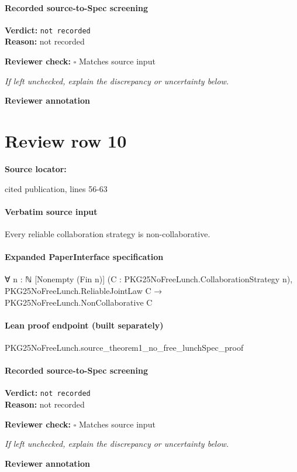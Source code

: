 \documentclass[10pt]{article}
\newcommand{\reviewerbox}{%
  \par\noindent\fbox{\parbox{0.96\linewidth}{\rule{0pt}{0.38in}}}\par
}
\newcommand{\reviewmatch}[1]{%
  \par\noindent\textbf{Reviewer check:} $\square$\; #1\par
  \noindent\emph{If left unchecked, explain the discrepancy or uncertainty below.}\par
}
\begin{document}
\paragraph{Recorded source-to-Spec screening}
\textbf{Verdict:} \texttt{not recorded}
\\
\textbf{Reason:} not recorded
\reviewmatch{Matches source input}
\noindent\textbf{Reviewer annotation}\par
\reviewerbox
\clearpage
\hypertarget{source-claim-bf0315dd1a18c70e}{}
\section*{Review row 10}
\textbf{Source locator:} {\footnotesize\raggedright cited publication, lines 56-\allowbreak{}63\par}
\paragraph{Verbatim source input}
\begin{ReviewVerbatim}
\setcounter{theorem}{0}
\begin{theorem}\label{thm:main}
    Every reliable collaboration strategy is non-collaborative.




\end{theorem}
\end{ReviewVerbatim}


\paragraph{Expanded PaperInterface specification}
\begin{ReviewVerbatim}
∀ {n : ℕ} [Nonempty (Fin n)] (C : PKG25NoFreeLunch.CollaborationStrategy n),
  PKG25NoFreeLunch.ReliableJointLaw C → PKG25NoFreeLunch.NonCollaborative C
\end{ReviewVerbatim}

\paragraph{Lean proof endpoint (built separately)}\begin{ReviewVerbatim}
PKG25NoFreeLunch.source_theorem1_no_free_lunchSpec_proof
\end{ReviewVerbatim}

\paragraph{Recorded source-to-Spec screening}
\textbf{Verdict:} \texttt{not recorded}
\\
\textbf{Reason:} not recorded
\reviewmatch{Matches source input}
\noindent\textbf{Reviewer annotation}\par
\reviewerbox
\clearpage
\hypertarget{source-claim-76d57f8e8060f2fd}{}
\end{document}
